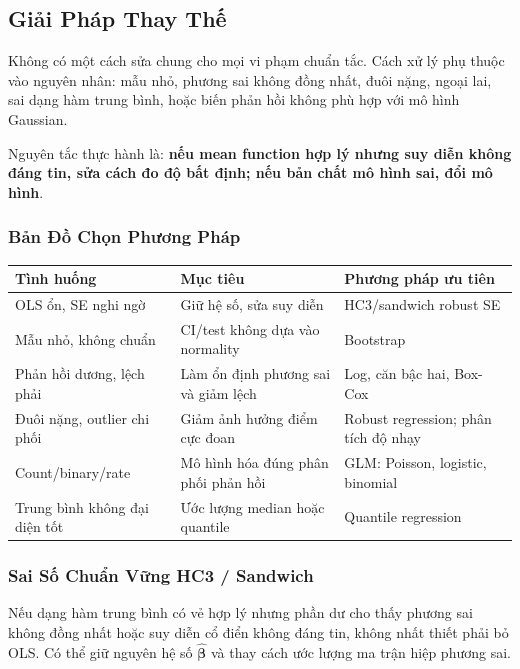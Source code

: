 \subsection{Giải Pháp Thay Thế}

Không có một cách sửa chung cho mọi vi phạm chuẩn tắc. Cách xử lý phụ thuộc vào nguyên nhân: mẫu nhỏ, phương sai không đồng nhất, đuôi nặng, ngoại lai, sai dạng hàm trung bình, hoặc biến phản hồi không phù hợp với mô hình Gaussian.

Nguyên tắc thực hành là: \textbf{nếu mean function hợp lý nhưng suy diễn không đáng tin, sửa cách đo độ bất định; nếu bản chất mô hình sai, đổi mô hình}.

\subsubsection{Bản Đồ Chọn Phương Pháp}

\begin{center}
\small
\begin{tabularx}{\textwidth}{@{}>{\raggedright\arraybackslash}p{3.4cm}>{\raggedright\arraybackslash}X>{\raggedright\arraybackslash}X@{}}
\toprule
\textbf{Tình huống} & \textbf{Mục tiêu} & \textbf{Phương pháp ưu tiên} \\
\midrule
OLS ổn, SE nghi ngờ & Giữ hệ số, sửa suy diễn & HC3/sandwich robust SE \\
Mẫu nhỏ, không chuẩn & CI/test không dựa vào normality & Bootstrap \\
Phản hồi dương, lệch phải & Làm ổn định phương sai và giảm lệch & Log, căn bậc hai, Box-Cox \\
Đuôi nặng, outlier chi phối & Giảm ảnh hưởng điểm cực đoan & Robust regression; phân tích độ nhạy \\
Count/binary/rate & Mô hình hóa đúng phân phối phản hồi & GLM: Poisson, logistic, binomial \\
Trung bình không đại diện tốt & Ước lượng median hoặc quantile & Quantile regression \\
\bottomrule
\end{tabularx}
\end{center}

\subsubsection{Sai Số Chuẩn Vững HC3 / Sandwich}

Nếu dạng hàm trung bình có vẻ hợp lý nhưng phần dư cho thấy phương sai không đồng nhất hoặc suy diễn cổ điển không đáng tin, không nhất thiết phải bỏ OLS. Có thể giữ nguyên hệ số $\hat{\boldsymbol{\beta}}$ và thay cách ước lượng ma trận hiệp phương sai.

